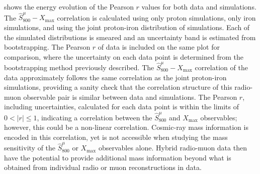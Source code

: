 






 shows the energy evolution of the Pearson $r$ values for both data and simulations.
The $\hat{S}^{\mu}_{800}-X_{\text{max}}$ correlation is calculated using only proton simulations, only iron simulations, and using the joint proton-iron distribution of simulations.
Each of the simulated distributions is smeared and an uncertainty band is estimated from bootstrapping.
The Pearson $r$ of data is included on the same plot for comparison, where the uncertainty on each data point is determined from the bootstrapping method previously described.
The $\hat{S}^{\mu}_{800}-X_{\text{max}}$ correlation of the data approximately follows the same correlation as the joint proton-iron simulations, providing a sanity check that the correlation structure of this radio-muon observable pair is similar between data and simulations.
The Pearson $r$, including uncertainties, calculated for each data point is within the limits of $0<|r|\leq1$, indicating a correlation between the $\hat{S}^{\mu}_{800}$ and $X_{\text{max}}$ observables; however, this could be a non-linear correlation.
Cosmic-ray mass information is encoded in this correlation, yet is not accessible when studying the mass sensitivity of the $\hat{S}^{\mu}_{800}$ or $X_{\text{max}}$ observables alone.
Hybrid radio-muon data then have the potential to provide additional mass information beyond what is obtained from individual radio or muon reconstructions in data.

